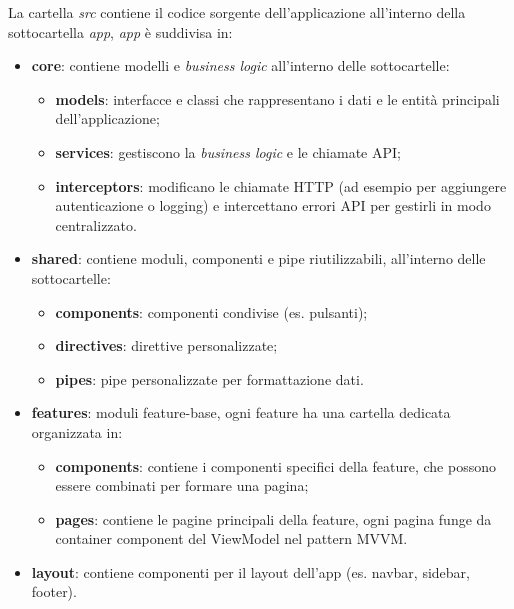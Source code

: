 La cartella \textit{src} contiene il codice sorgente dell'applicazione all'interno della sottocartella \textit{app}, \textit{app} è suddivisa in:
\begin{itemize}
    \item \textbf{core}: contiene modelli e \textit{business logic} all'interno delle sottocartelle:
    \begin{itemize}
        \item \textbf{models}: interfacce e classi che rappresentano i dati e le entità principali dell'applicazione;
        \item \textbf{services}: gestiscono la \textit{business logic} e le chiamate API;
        \item \textbf{interceptors}: modificano le chiamate HTTP (ad esempio per aggiungere autenticazione o logging) e intercettano errori API per gestirli in modo centralizzato.
    \end{itemize}
    \item \textbf{shared}: contiene moduli, componenti e pipe riutilizzabili, all'interno delle sottocartelle:
    \begin{itemize}
        \item \textbf{components}: componenti condivise (es. pulsanti);
        \item \textbf{directives}: direttive personalizzate;
        \item \textbf{pipes}: pipe personalizzate per formattazione dati.
    \end{itemize} 
    \item \textbf{features}: moduli feature-base, ogni feature ha una cartella dedicata organizzata in:
    \begin{itemize}
        \item \textbf{components}: contiene i componenti specifici della feature, che possono essere combinati per formare una pagina;
        \item \textbf{pages}: contiene le pagine principali della feature, ogni pagina funge da container component del ViewModel nel pattern MVVM.
    \end{itemize}
    \item \textbf{layout}: contiene componenti per il layout dell'app (es. navbar, sidebar, footer).
\end{itemize}
